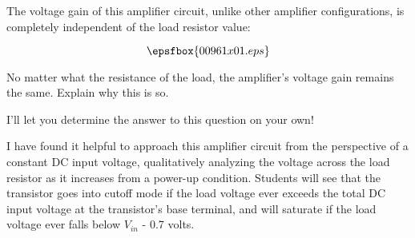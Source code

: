 

The voltage gain of this amplifier circuit, unlike other amplifier configurations, is completely independent of the load resistor value:

$$\epsfbox{00961x01.eps}$$

No matter what the resistance of the load, the amplifier's voltage gain remains the same.  Explain why this is so.







I'll let you determine the answer to this question on your own!







I have found it helpful to approach this amplifier circuit from the perspective of a constant DC input voltage, qualitatively analyzing the voltage across the load resistor as it increases from a power-up condition.  Students will see that the transistor goes into cutoff mode if the load voltage ever exceeds the total DC input voltage at the transistor's base terminal, and will saturate if the load voltage ever falls below $V_{in}$ - 0.7 volts.




